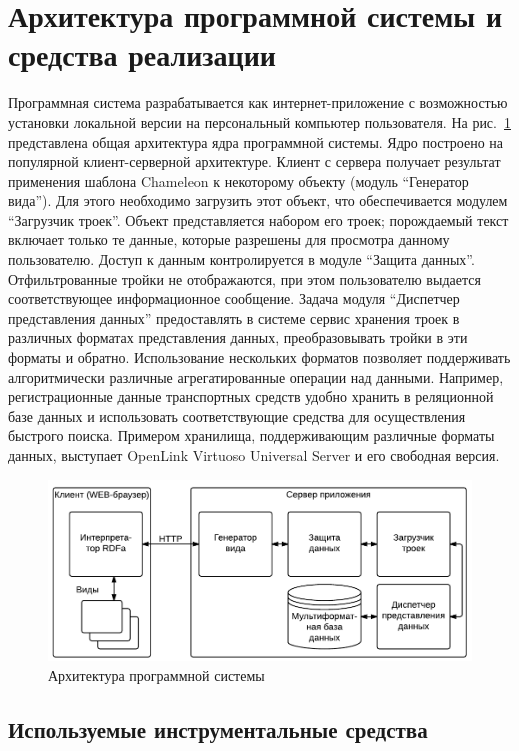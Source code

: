 \documentclass[utf8]{../IncArticle}
\begin{document}
\section{Архитектура программной системы и средства реализации}

Программная система разрабатывается как интернет-приложение с
возможностью установки локальной версии на персональный компьютер
пользователя.  На рис.~\ref{architecture} представлена общая
архитектура ядра программной системы.  Ядро построено на популярной
клиент-серверной архитектуре.  Клиент с сервера получает результат
применения шаблона Chameleon к некоторому объекту (модуль ``Генератор
вида'').  Для этого необходимо загрузить этот объект, что
обеспечивается модулем ``Загрузчик троек''.  Объект представляется
набором его троек; порождаемый текст включает только те данные,
которые разрешены для просмотра данному пользователю.  Доступ к данным
контролируется в модуле ``Защита данных''.  Отфильтрованные тройки не
отображаются, при этом пользователю выдается соответствующее
информационное сообщение.  Задача модуля ``Диспетчер представления
данных'' предоставлять в системе сервис хранения троек в различных
форматах представления данных, преобразовывать тройки в эти форматы и
обратно.  Использование нескольких форматов позволяет поддерживать
алгоритмически различные агрегатированные операции над данными.
Например, регистрационные данные транспортных средств удобно хранить в
реляционной базе данных и использовать соответствующие средства для
осуществления быстрого поиска.  Примером хранилища, поддерживающим
различные форматы данных, выступает OpenLink Virtuoso Universal Server
\cite{b2:8} и его свободная версия.

\begin{figure}[!t]
\centering
\includegraphics[width=0.8\linewidth]{peixe-architecture-ru-1.pdf}
\caption{Архитектура программной системы}
\label{architecture}
\end{figure}

\subsection{Используемые инструментальные средства}
\label{sec:instr}
\end{document}
